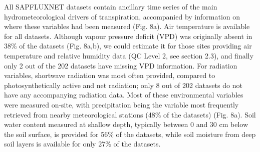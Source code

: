 \documentclass[11pt,twoside]{reedthesis}
\begin{document}
All SAPFLUXNET datasets contain ancillary time series of the main
hydrometeorological drivers of transpiration, accompanied by information
on where these variables had been measured (Fig. 8a). Air temperature is
available for all datasets. Although vapour pressure deficit (VPD) was
originally absent in 38\% of the datasets (Fig. 8a,b), we could estimate
it for those sites providing air temperature and relative humidity data
(QC Level 2, see section 2.3), and finally only 2 out of the 202
datasets have missing VPD information. For radiation variables,
shortwave radiation was most often provided, compared to
photosynthetically active and net radiation; only 8 out of 202 datasets
do not have any accompanying radiation data. Most of these environmental
variables were measured on-site, with precipitation being the variable
most frequently retrieved from nearby meteorological stations (48\% of
the datasets) (Fig. 8a). Soil water content measured at shallow depth,
typically between 0 and 30 cm below the soil surface, is provided for
56\% of the datasets, while soil moisture from deep soil layers is
available for only 27\% of the datasets.\par
\end{document}
